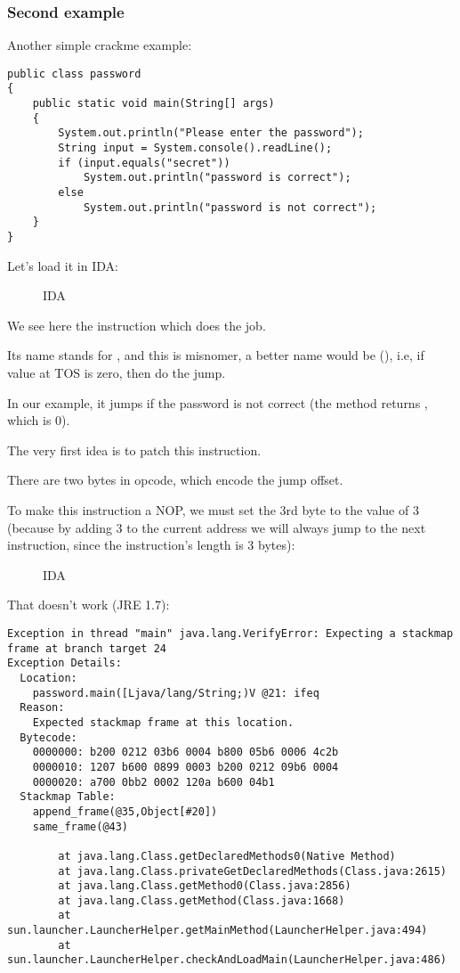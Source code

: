 \subsubsection{Second example}

Another simple crackme example:

\begin{lstlisting}[style=customjava]
public class password
{
	public static void main(String[] args)
	{
		System.out.println("Please enter the password");
		String input = System.console().readLine();
		if (input.equals("secret"))
			System.out.println("password is correct");
		else
			System.out.println("password is not correct");
	}
}
\end{lstlisting}

Let's load it in IDA:

\begin{figure}[H]
\centering
{}
\caption{IDA}
\end{figure}

We see here the  instruction which does the job.

Its name stands for , and this is misnomer, a better name would be  (), i.e, 
if value at \ac{TOS} is zero, then do the jump.

In our example, it jumps if the password is not correct 
(the  method returns , which is 0).

The very first idea is to patch this instruction.

There are two bytes in  opcode, which encode the jump offset.

To make this instruction a NOP, we must set the 3rd byte to the value of 3 
(because by adding 3 to the current address we will always jump to the next instruction,
since the  instruction's length is 3 bytes):


\begin{figure}[H]
\centering
{}
\caption{IDA}
\end{figure}

That doesn't work (JRE 1.7):

\begin{lstlisting}
Exception in thread "main" java.lang.VerifyError: Expecting a stackmap frame at branch target 24
Exception Details:
  Location:
    password.main([Ljava/lang/String;)V @21: ifeq
  Reason:
    Expected stackmap frame at this location.
  Bytecode:
    0000000: b200 0212 03b6 0004 b800 05b6 0006 4c2b
    0000010: 1207 b600 0899 0003 b200 0212 09b6 0004
    0000020: a700 0bb2 0002 120a b600 04b1
  Stackmap Table:
    append_frame(@35,Object[#20])
    same_frame(@43)

        at java.lang.Class.getDeclaredMethods0(Native Method)
        at java.lang.Class.privateGetDeclaredMethods(Class.java:2615)
        at java.lang.Class.getMethod0(Class.java:2856)
        at java.lang.Class.getMethod(Class.java:1668)
        at sun.launcher.LauncherHelper.getMainMethod(LauncherHelper.java:494)
        at sun.launcher.LauncherHelper.checkAndLoadMain(LauncherHelper.java:486)
\end{lstlisting}

